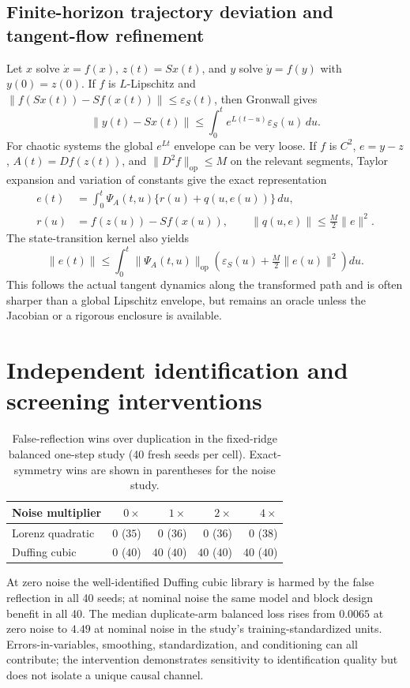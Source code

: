 \subsection{Finite-horizon trajectory deviation and tangent-flow refinement}
Let $x$ solve $\dot x=f(x)$, $z(t)=Sx(t)$, and $y$ solve $\dot y=f(y)$ with $y(0)=z(0)$. If $f$ is $L$-Lipschitz and $\|f(Sx(t))-Sf(x(t))\|\le\varepsilon_S(t)$, then Gronwall gives
\[
\|y(t)-Sx(t)\|\le\int_0^t e^{L(t-u)}\varepsilon_S(u)\,du.
\]
For chaotic systems the global $e^{Lt}$ envelope can be very loose. If $f$ is $C^2$, $e=y-z$, $A(t)=Df(z(t))$, and $\|D^2f\|_{\mathrm{op}}\le M$ on the relevant segments, Taylor expansion and variation of constants give the exact representation
\[
\begin{aligned}
e(t)&=\int_0^t\Psi_A(t,u)\{r(u)+q(u,e(u))\}\,du,\\
r(u)&=f(z(u))-Sf(x(u)),\qquad
\|q(u,e)\|\le\tfrac{M}{2}\|e\|^2.
\end{aligned}
\]
The state-transition kernel also yields
\[
\|e(t)\|\le\int_0^t\|\Psi_A(t,u)\|_{\mathrm{op}}
\left(\varepsilon_S(u)+\tfrac{M}{2}\|e(u)\|^2\right)du.
\]
This follows the actual tangent dynamics along the transformed path and is often sharper than a global Lipschitz envelope, but remains an oracle unless the Jacobian or a rigorous enclosure is available.

\section{Independent identification and screening interventions}\label{app:interventions}
\begin{table}[h]
\centering\small
\caption{False-reflection wins over duplication in the fixed-ridge balanced one-step study (40 fresh seeds per cell). Exact-symmetry wins are shown in parentheses for the noise study.}
\begin{tabular}{lrrrr}
\toprule
Noise multiplier & $0\times$ & $1\times$ & $2\times$ & $4\times$\\
\midrule
Lorenz quadratic & $0$ ($35$) & $0$ ($36$) & $0$ ($36$) & $0$ ($38$)\\
Duffing cubic & $0$ ($40$) & $40$ ($40$) & $40$ ($40$) & $40$ ($40$)\\
\bottomrule
\end{tabular}
\end{table}
At zero noise the well-identified Duffing cubic library is harmed by the false reflection in all 40 seeds; at nominal noise the same model and block design benefit in all 40. The median duplicate-arm balanced loss rises from $0.0065$ at zero noise to $4.49$ at nominal noise in the study's training-standardized units. Errors-in-variables, smoothing, standardization, and conditioning can all contribute; the intervention demonstrates sensitivity to identification quality but does not isolate a unique causal channel.


